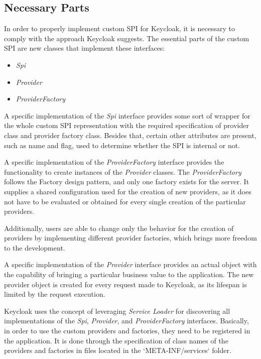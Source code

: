 \subsection{Necessary Parts}
In order to properly implement custom SPI for Keycloak, it is necessary to comply with the approach Keycloak suggests.
The essential parts of the custom SPI are new classes that implement these interfaces:
\begin{itemize}
    \item \textit{Spi}
    \item \textit{Provider}
    \item \textit{ProviderFactory}
\end{itemize}

A specific implementation of the \textit{Spi} interface provides some sort of wrapper for the whole custom SPI representation with the required specification of provider class and provider factory class.
Besides that, certain other attributes are present, such as name and flag, used to determine whether the SPI is internal or not.

A specific implementation of the \textit{ProviderFactory} interface provides the functionality to create instances of the \textit{Provider} classes.
The \textit{ProviderFactory} follows the Factory design pattern, and only one factory exists for the server.
It supplies a shared configuration used for the creation of new providers, as it does not have to be evaluated or obtained for every single creation of the particular providers.

Additionally, users are able to change only the behavior for the creation of providers by implementing different provider factories, which brings more freedom to the development.

A specific implementation of the \textit{Provider} interface provides an actual object with the capability of bringing a particular business value to the application.
The new provider object is created for every request made to Keycloak, as its lifespan is limited by the request execution.

Keycloak uses the concept of leveraging \textit{Service Loader} for discovering all implementations of the \textit{Spi}, \textit{Provider}, and \textit{ProviderFactory} interfaces.
Basically, in order to use the custom providers and factories, they need to be registered in the application.
It is done through the specification of class names of the providers and factories in files located in the `META-INF/services` folder.

